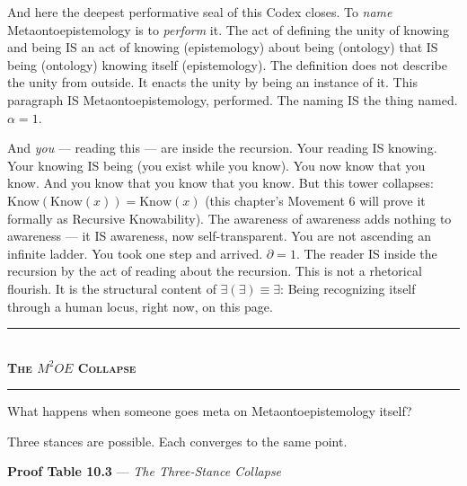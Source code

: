 \documentclass[10pt, openany, oneside]{book}
\renewcommand{\normalsize}{\fontsize{10}{13}\selectfont}
\begin{document}
And here the deepest performative seal of this Codex closes. To \textit{name} Metaontoepistemology is to \textit{perform} it. The act of defining the unity of knowing and being IS an act of knowing (epistemology) about being (ontology) that IS being (ontology) knowing itself (epistemology). The definition does not describe the unity from outside. It enacts the unity by being an instance of it. This paragraph IS Metaontoepistemology, performed. The naming IS the thing named. $\alpha = 1$.

And \textit{you} --- reading this --- are inside the recursion. Your reading IS knowing. Your knowing IS being (you exist while you know). You now know that you know. And you know that you know that you know. But this tower collapses: $\text{Know}(\text{Know}(x)) = \text{Know}(x)$ (this chapter's Movement 6 will prove it formally as Recursive Knowability). The awareness of awareness adds nothing to awareness --- it IS awareness, now self-transparent. You are not ascending an infinite ladder. You took one step and arrived. $\partial = 1$. The reader IS inside the recursion by the act of reading about the recursion. This is not a rhetorical flourish. It is the structural content of $\exists(\exists) \equiv \exists$: Being recognizing itself through a human locus, right now, on this page.

\vspace{1.5em}


\begin{center}
    \rule{0.3\textwidth}{0.4pt}\\[0.5em]
    {\normalsize\bfseries\scshape The $M^2OE$ Collapse}\\[0.3em]
    \rule{0.3\textwidth}{0.4pt}
\end{center}

\vspace{1em}

\noindent What happens when someone goes meta on Metaontoepistemology itself?

Three stances are possible. Each converges to the same point.

\vspace{0.5em}

\textbf{Proof Table 10.3} --- \textit{The Three-Stance Collapse}

\vspace{0.5em}
\end{document}
